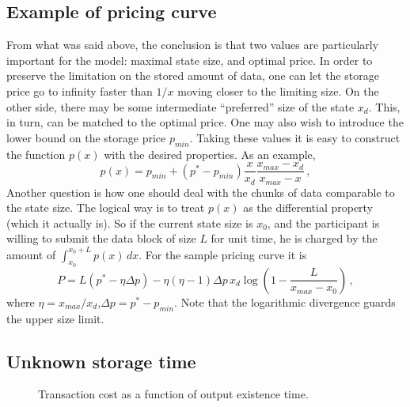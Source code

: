 \documentclass[]{llncs}   %
\newcommand{\authnote}[2]{\marginpar{\parbox{\marginparwidth}{\tiny %
  \textsf{#1 {\textcolor{blue}{notes: #2}}}}}%
  \textcolor{blue}{\textbf{\dag}}}
\newcommand{\authnote}[2]{
  \textsf{#1\textcolor{blue}{ #2}}}
\newcommand{\authnote}[2]{}
\newcommand{\vk}[1]{{\authnote{\textcolor{red}{V:}}{#1}}}
\begin{document}
\subsection{Example of pricing curve}
From what was said above, the conclusion is that two values are particularly
important for the model: maximal state size, and optimal price. In order to
preserve the limitation on the stored amount of data, one can let the storage price go to infinity
faster than $1/x$ moving closer to the limiting size. On the other side, there
may be some intermediate ``preferred'' size of the state $x_d$. This, in turn,
can be matched to the optimal price. One may also wish to introduce the lower
bound on the storage price $p_{min}$. Taking these values it is easy to
construct the function $p(x)$ with the desired properties. As an example,
\begin{equation}
    p(x) = p_{min}+(p^*-p_{min})\frac{x}{x_d}\frac{x_{max}-x_d}{x_{max}-x}\,,
    \label{eq:sample_price}
\end{equation}
Another question is how one should deal with the chunks of data comparable to
the state size. The logical way is to treat $p(x)$ as the differential property
(which it actually is). So if the current state size is $x_0$, and the
participant is willing to submit the data block of size $L$ for unit time, he is
charged by the amount of $\int_{x_0}^{x_0+L}p(x)\,dx$. For the sample pricing
curve it is
\begin{equation}
    P = L\left(p^*-\eta \Delta p \right)
    -
    \eta(\eta-1)\Delta p\, x_d
    \log\left(1-\frac{L}{x_{max}-x_0}\right)\,,
    \label{eq:sample_chunk}
\end{equation}
where $\eta=x_{max}/x_d$,$\Delta p=p^*-p_{min}$. Note that the logarithmic
divergence guards the upper size limit.

\subsection{Unknown storage time}
\vk{Here --- Dima's idea as we discussed it in Moscow. Q: postpaid, or
pay-as-you-go?}
\begin{figure}
    \center
    
    \caption{Transaction cost as a function of output existence time.\label{fig:max_t}}
\end{figure}




\appendix
\end{document}
